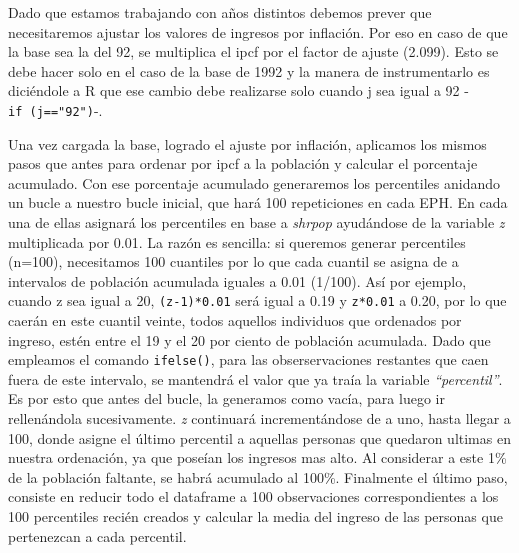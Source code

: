 \documentclass[
]{book}
\begin{document}
Dado que estamos trabajando con años distintos debemos prever que necesitaremos ajustar los valores de ingresos por inflación. Por eso en caso de que la base sea la del 92, se multiplica el ipcf por el factor de ajuste (2.099). Esto se debe hacer solo en el caso de la base de 1992 y la manera de instrumentarlo es diciéndole a R que ese cambio debe realizarse solo cuando j sea igual a 92 -\texttt{if\ (j=="92")}-.

Una vez cargada la base, logrado el ajuste por inflación, aplicamos los mismos pasos que antes para ordenar por ipcf a la población y calcular el porcentaje acumulado. Con ese porcentaje acumulado generaremos los percentiles anidando un bucle a nuestro bucle inicial, que hará 100 repeticiones en cada EPH. En cada una de ellas asignará los percentiles en base a \emph{shrpop} ayudándose de la variable \emph{z} multiplicada por 0.01. La razón es sencilla: si queremos generar percentiles (n=100), necesitamos 100 cuantiles por lo que cada cuantil se asigna de a intervalos de población acumulada iguales a 0.01 (1/100). Así por ejemplo, cuando z sea igual a 20, \texttt{(z-1)*0.01} será igual a 0.19 y \texttt{z*0.01} a 0.20, por lo que caerán en este cuantil veinte, todos aquellos individuos que ordenados por ingreso, estén entre el 19 y el 20 por ciento de población acumulada. Dado que empleamos el comando \texttt{ifelse()}, para las obserservaciones restantes que caen fuera de este intervalo, se mantendrá el valor que ya traía la variable \emph{``percentil''}. Es por esto que antes del bucle, la generamos como vacía, para luego ir rellenándola sucesivamente. \emph{z} continuará incrementándose de a uno, hasta llegar a 100, donde asigne el último percentil a aquellas personas que quedaron ultimas en nuestra ordenación, ya que poseían los ingresos mas alto. Al considerar a este 1\% de la población faltante, se habrá acumulado al 100\%. Finalmente el último paso, consiste en reducir todo el dataframe a 100 observaciones correspondientes a los 100 percentiles recién creados y calcular la media del ingreso de las personas que pertenezcan a cada percentil.
\end{document}
